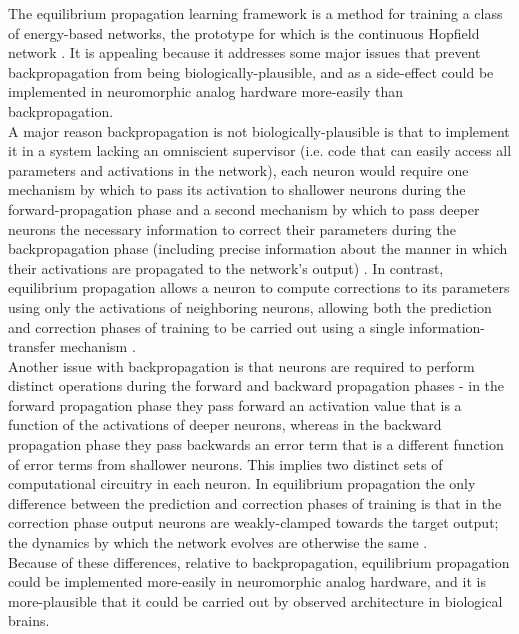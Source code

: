 \documentclass[format=sigconf]{acmart}
\newcommand{\npar}{\\\indent}
\begin{document}
The equilibrium propagation learning framework \cite{scellier17} is a method for training a class of energy-based networks, the prototype for which is the continuous Hopfield network \cite{hopfield1984}. It is appealing because it addresses some major issues that prevent backpropagation from being biologically-plausible, and as a side-effect could be implemented in neuromorphic analog hardware more-easily than backpropagation.
\npar
A major reason backpropagation is not biologically-plausible is that to implement it in a system lacking an omniscient supervisor (i.e. code that can easily access all parameters and activations in the network), each neuron would require one mechanism by which to pass its activation to shallower neurons during the forward-propagation phase and a second mechanism by which to pass deeper neurons the necessary information to correct their parameters during the backpropagation phase (including precise information about the manner in which their activations are propagated to the network's output) \cite{bengio2015}. In contrast, equilibrium propagation allows a neuron to compute corrections to its parameters using only the activations of neighboring neurons, allowing both the prediction and correction phases of training to be carried out using a single information-transfer mechanism \cite{scellier17}.
\npar
Another issue with backpropagation is that neurons are required to perform distinct operations during the forward and backward propagation phases - in the forward propagation phase they pass forward an activation value that is a function of the activations of deeper neurons, whereas in the backward propagation phase they pass backwards an error term that is a different function of error terms from shallower neurons. This implies two distinct sets of computational circuitry in each neuron. In equilibrium propagation the only difference between the prediction and correction phases of training is that in the correction phase output neurons are weakly-clamped towards the target output; the dynamics by which the network evolves are otherwise the same \cite{scellier17}.
\npar
Because of these differences, relative to backpropagation, equilibrium propagation could be implemented more-easily in neuromorphic analog hardware, and it is more-plausible that it could be carried out by observed architecture in biological brains.
\npar
\end{document}
